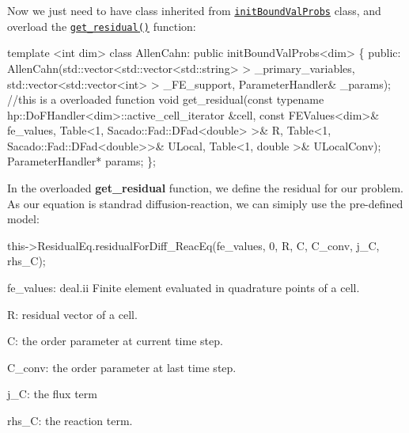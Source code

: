  Now we just need to have class inherited from \href{../html/classinit_bound_val_probs.html}{\tt init\-Bound\-Val\-Probs} class, and overload the \href{../html/classinit_bound_val_probs.html#ac8f2c3e2a1040c70b709900dc3dfdaea}{\tt get\-\_\-residual()} function\-: 
\begin{DoxyCode}
\textcolor{keyword}{template} <\textcolor{keywordtype}{int} dim>
\textcolor{keyword}{class }AllenCahn: \textcolor{keyword}{public} initBoundValProbs<dim>
\{
    \textcolor{keyword}{public}:
        AllenCahn(std::vector<std::vector<std::string> > \_primary\_variables, std::vector<std::vector<int> >
       \_FE\_support, ParameterHandler& \_params);
        \textcolor{comment}{//this is a overloaded function }
        \textcolor{keywordtype}{void} get_residual(\textcolor{keyword}{const} \textcolor{keyword}{typename} hp::DoFHandler<dim>::active\_cell\_iterator &cell, \textcolor{keyword}{const} 
      FEValues<dim>& fe\_values, Table<1, Sacado::Fad::DFad<double> >& R, Table<1, Sacado::Fad::DFad<double>>& ULocal, 
      Table<1, double >& ULocalConv);
        ParameterHandler* params;       
\};
\end{DoxyCode}
 In the overloaded {\bfseries get\-\_\-residual} function, we define the residual for our problem. As our equation is standrad diffusion-\/reaction, we can simiply use the pre-\/defined model\-: 
\begin{DoxyCode}
this->ResidualEq.residualForDiff_ReacEq(fe\_values, 0, R, C, C\_conv, j\_C, rhs\_C);
\end{DoxyCode}


fe\-\_\-values\-: deal.\-ii Finite element evaluated in quadrature points of a cell.

R\-: residual vector of a cell.

C\-: the order parameter at current time step.

C\-\_\-conv\-: the order parameter at last time step.

j\-\_\-\-C\-: the flux term

rhs\-\_\-\-C\-: the reaction term. 



